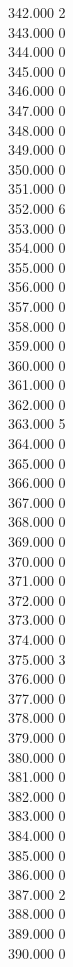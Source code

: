 { 342.000	2 \\
 343.000	0 \\
 344.000	0 \\
 345.000	0 \\
 346.000	0 \\
 347.000	0 \\
 348.000	0 \\
 349.000	0 \\
 350.000	0 \\
 351.000	0 \\
 352.000	6 \\
 353.000	0 \\
 354.000	0 \\
 355.000	0 \\
 356.000	0 \\
 357.000	0 \\
 358.000	0 \\
 359.000	0 \\
 360.000	0 \\
 361.000	0 \\
 362.000	0 \\
 363.000	5 \\
 364.000	0 \\
 365.000	0 \\
 366.000	0 \\
 367.000	0 \\
 368.000	0 \\
 369.000	0 \\
 370.000	0 \\
 371.000	0 \\
 372.000	0 \\
 373.000	0 \\
 374.000	0 \\
 375.000	3 \\
 376.000	0 \\
 377.000	0 \\
 378.000	0 \\
 379.000	0 \\
 380.000	0 \\
 381.000	0 \\
 382.000	0 \\
 383.000	0 \\
 384.000	0 \\
 385.000	0 \\
 386.000	0 \\
 387.000	2 \\
 388.000	0 \\
 389.000	0 \\
 390.000	0 \\
}
